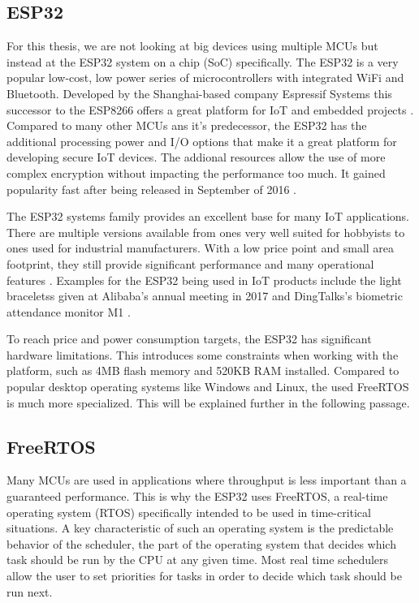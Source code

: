 \subsection{ESP32}
For this thesis, we are not looking at big devices using multiple MCUs but instead at the ESP32 system on a chip (SoC) specifically. The ESP32 is a very popular low-cost, low power series of microcontrollers with integrated WiFi and Bluetooth. Developed by the Shanghai-based company Espressif Systems this successor to the ESP8266 offers a great platform for IoT and embedded projects \autocite{noauthor_esp32_nodate}. Compared to many other MCUs ans it's predecessor, the ESP32 has the additional processing power and I/O options that make it a great platform for developing secure IoT devices. The addional resources allow the use of more complex encryption without impacting the performance too much. It gained popularity fast after being released in September of 2016 \autocite{espressif_systems_espressif_2016}.

The ESP32 systems family provides an excellent base for many IoT applications. There are multiple versions available from ones very well suited for hobbyists to ones used for industrial manufacturers. With a low price point and small area footprint, they still provide significant performance and many operational features \autocite{maier_comparative_2017}. Examples for the ESP32 being used in IoT products include the light braceletss given at Alibaba's annual meeting in 2017 \autocite{noauthor_alibabas_2017} and DingTalks's biometric attendance monitor M1 \autocite{noauthor_dingtalks_2017}.

To reach price and power consumption targets, the ESP32 has significant hardware limitations. This introduces some constraints when working with the platform, such as 4MB flash memory and 520KB RAM installed. Compared to popular desktop operating systems like Windows and Linux, the used FreeRTOS is much more specialized. This will be explained further in the following passage.

\subsection{FreeRTOS}\label{subsec:freertos}

Many MCUs are used in applications where throughput is less important than a guaranteed performance. This is why the ESP32 uses FreeRTOS, a real-time operating system (RTOS) specifically intended to be used in time-critical situations. A key characteristic of such an operating system is the predictable behavior of the scheduler, the part of the operating system that decides which task should be run by the CPU at any given time. Most real time schedulers allow the user to set priorities for tasks in order to decide which task should be run next.

